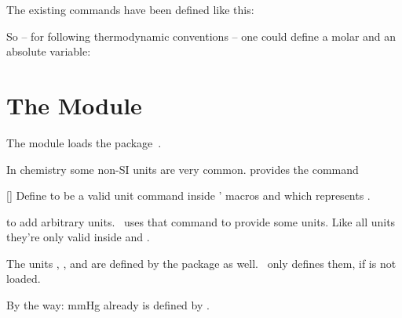 \documentclass{chemmacros-manual}
\begin{document}
The existing commands have been defined like this:
\begin{sourcecode}
  \NewChemState {}
  \NewChemState {}
  \NewChemState {}
\end{sourcecode}

So -- for following thermodynamic conventions -- one could define a molar and
an absolute variable:
\begin{example}
  \RenewChemState{}%
  \NewChemState{}%
   
\end{example}

\section{The  Module}\label{sec:units-module}

The  module loads the 
package~\cite{pkg:siunitx}.

In chemistry some non-SI units are very common.   provides the
command
\begin{commands}
  []
    Define  to be a valid unit command inside ' macros
     and  which represents .
\end{commands}
to add arbitrary units.  \chemmacros\ uses that command to provide some
units.  Like all  units they're only valid inside
 and .
\begin{commands}
   \si{\atmosphere}
   \si{\atm}
   \si{\calory}
   \si{\cal}
   \si{\cmc} \par
    The units , , and  are defined by the
    package  as well.  \chemmacros\ only defines them, if
     is not loaded.
   \si{\molar}
   \si{\moLar}
   \si{\Molar}
   \si{\MolMass}
   \si{\normal}
   \si{\torr}
\end{commands}

By the way:  \si{\mmHg} already is defined by .
\end{document}
